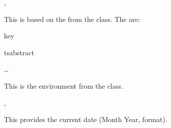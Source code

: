 \documentclass{article}
\begin{document}
\begin{codedescribe}[code]{\typesettitle,\tstitle}
\begin{codesyntax}
\end{codesyntax}
This is based on the \tsobj[code]{\maketitle} from the  class. The  are:
\end{codedescribe}

\begin{describelist}{key}
\end{describelist}

\begin{codedescribe}[env]{tsabstract}
\begin{codesyntax}
\tsmacro{\begin{tsabstract}}{}
\ldots
\tsmacro{\end{tsabstract}}{}
\end{codesyntax}
This is the  environment from the  class.
\end{codedescribe}

\begin{codedescribe}[code,new=2023/05/16]{\typesetdate,\tsdate}
\begin{codesyntax}
\tsmacro{\typesetdate}{}
\tsmacro{\tsdate}{}
\end{codesyntax}
This provides the current date (Month Year, format).
\end{codedescribe}
\end{document}
